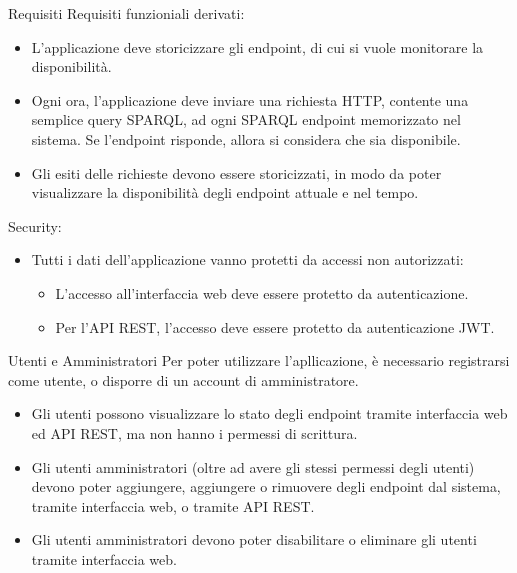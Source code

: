 \documentclass[8pt]{beamer}
\begin{document}
\begin{frame}{Requisiti}
    Requisiti funzioniali derivati:
    \begin{itemize}
        \item L'applicazione deve storicizzare gli endpoint, di cui si vuole monitorare la disponibilità.
        \item Ogni ora, l'applicazione deve inviare una richiesta HTTP, contente una semplice query SPARQL, ad ogni SPARQL endpoint memorizzato nel sistema. Se l'endpoint risponde, allora si considera che sia disponibile.
        \item Gli esiti delle richieste devono essere storicizzati, in modo da poter visualizzare la disponibilità degli endpoint attuale e nel tempo.
    \end{itemize}
    Security:
    \begin{itemize}
        \item Tutti i dati dell'applicazione vanno protetti da accessi non autorizzati:
              \begin{itemize}
                  \item L'accesso all'interfaccia web deve essere protetto da autenticazione.
                  \item Per l'API REST, l'accesso deve essere protetto da autenticazione JWT.
              \end{itemize}
    \end{itemize}
\end{frame}

\begin{frame}{Utenti e Amministratori}
    Per poter utilizzare l'apllicazione, è necessario registrarsi come utente, o disporre
    di un account di amministratore.
    \begin{itemize}
        \item Gli utenti possono visualizzare lo stato degli endpoint tramite interfaccia web ed API REST, ma non hanno i permessi di scrittura.
        \item Gli utenti amministratori (oltre ad avere gli stessi permessi degli utenti) devono poter aggiungere, aggiungere o rimuovere degli endpoint dal sistema, tramite interfaccia web, o tramite API REST.
        \item Gli utenti amministratori devono poter disabilitare o eliminare gli utenti tramite interfaccia web.
    \end{itemize}
\end{frame}
\end{document}
